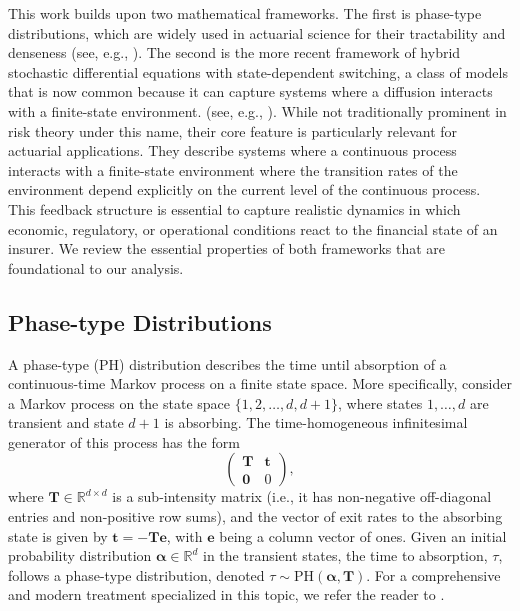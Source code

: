 \documentclass[11pt]{article}
\numberwithin{table}{section}
\numberwithin{figure}{section}
\numberwithin{equation}{section}
\newcommand{\1}{{\mathbf 1}}
\newcommand{\0}{\mat{0}}
\begin{document}
This work builds upon two mathematical frameworks. The first is phase-type distributions, which are widely used in actuarial science for their tractability and denseness (see, e.g., \cite{asmussen2010ruin, bladt2017matrix}). The second is the more recent framework of hybrid stochastic differential equations with state-dependent switching, a class of models that is now common because it can capture systems where a diffusion interacts with a finite-state environment. (see, e.g., \cite{yin2010hybrid}). While not traditionally prominent in risk theory under this name, their core feature is particularly relevant for actuarial applications. They describe systems where a continuous process interacts with a finite-state environment where the transition rates of the environment depend explicitly on the current level of the continuous process. This feedback structure is essential to capture realistic dynamics in which economic, regulatory, or operational conditions react to the financial state of an insurer. We review the essential properties of both frameworks that are foundational to our analysis.

\subsection{Phase-type Distributions}

A phase-type (PH) distribution describes the time until absorption of a continuous-time Markov process on a finite state space. More specifically, consider a Markov process on the state space \( \{1, 2, \dots, d, d+1\} \), where states \(1, \dots, d\) are transient and state \(d+1\) is absorbing. The time-homogeneous infinitesimal generator of this process has the form
\[
\begin{pmatrix}
\bm{T} & \bm{t} \\
\bm{0} & 0
\end{pmatrix},
\]
where \( \bm{T} \in \mathbb{R}^{d \times d} \) is a sub-intensity matrix (i.e., it has non-negative off-diagonal entries and non-positive row sums), and the vector of exit rates to the absorbing state is given by \( \bm{t} = -\bm{T} \bm{e} \), with \(\bm{e}\) being a column vector of ones. Given an initial probability distribution \(\bm{\alpha} \in \mathbb{R}^d\) in the transient states, the time to absorption, \( \tau \), follows a phase-type distribution, denoted \(\tau \sim \mbox{PH}(\bm{\alpha}, \bm{T})\). For a comprehensive and modern treatment specialized in this topic, we refer the reader to \cite{bladt2017matrix}.
\end{document}
